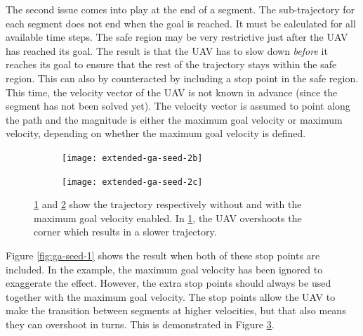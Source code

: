 The second issue comes into play at the end of a segment. The sub-trajectory for each segment does not end when the goal is reached. It must be calculated for all available time steps. The safe region may be very restrictive just after the UAV has reached its goal. The result is that the UAV has to slow down \emph{before} it reaches its goal to ensure that the rest of the trajectory stays within the safe region. This can also by counteracted by including a stop point in the safe region. This time, the velocity vector of the UAV is not known in advance (since the segment has not been solved yet). The velocity vector is assumed to point along the path and the magnitude is either the maximum goal velocity or maximum velocity, depending on whether the maximum goal velocity is defined.
\par

\begin{figure}
	\centering
	\begin{subfigure}[t]{0.30\columnwidth}
        		\texttt{[image: extended-ga-seed-2b]}
        		\caption{}
        		 \label{fig:ga-seed-nomaxvelb}
	\end{subfigure}	
	\hfill
	\begin{subfigure}[t]{0.30\columnwidth}
        		\texttt{[image: extended-ga-seed-2c]}
        		\caption{}
        		 \label{fig:ga-seed-maxvelc}
	\end{subfigure}		
	\caption[A demonstration of why stop points should only be used with a maximum goal velocity.]{ \ref{fig:ga-seed-nomaxvelb} and \ref{fig:ga-seed-maxvelc} show the trajectory respectively without and with the maximum goal velocity enabled. In \ref{fig:ga-seed-nomaxvelb}, the UAV overshoots the corner which results in a slower trajectory.}
    \label{fig:ga-seed-maxvel}     
\end{figure}

\clearpage

Figure \ref{fig:ga-seed-1} shows the result when both of these stop points are included. In the example, the maximum goal velocity has been ignored to exaggerate the effect. However, the extra stop points should always be used together with the maximum goal velocity. The stop points allow the UAV to make the transition between segments at higher velocities, but that also means they can overshoot in turns. This is demonstrated in Figure \ref{fig:ga-seed-maxvel}.

